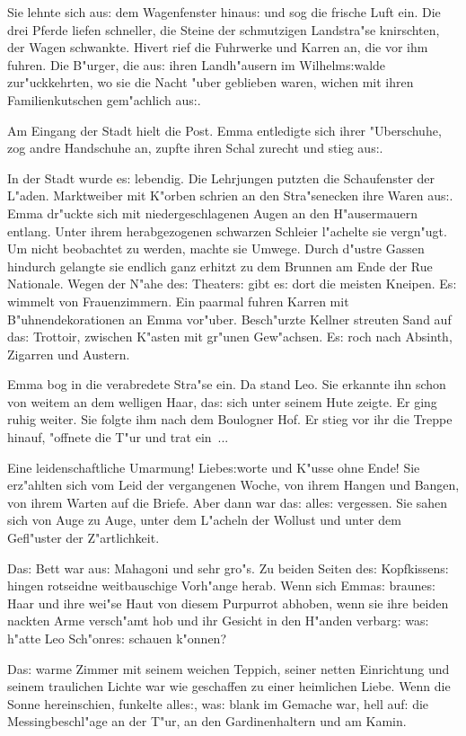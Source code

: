 \documentclass[oneside,12pt]{book}
\newcommand{\s}{s:}%
\begin{document}
Sie lehnte sich au{\s} dem Wagenfenster hinau{\s} und sog die
frische Luft ein. Die drei Pferde liefen schneller, die Steine der
schmutzigen Landstra"se knirschten, der Wagen schwankte. Hivert
rief die Fuhrwerke und Karren an, die vor ihm fuhren. Die B"urger,
die au{\s} ihren Landh"ausern im Wilhelm{\s}walde zur"uckkehrten,
wo sie die Nacht "uber geblieben waren, wichen mit ihren
Familienkutschen gem"achlich au{\s}.

Am Eingang der Stadt hielt die Post. Emma entledigte sich ihrer
"Uberschuhe, zog andre Handschuhe an, zupfte ihren Schal zurecht
und stieg au{\s}.

In der Stadt wurde e{\s} lebendig. Die Lehrjungen putzten die
Schaufenster der L"aden. Marktweiber mit K"orben schrien an den
Stra"senecken ihre Waren au{\s}. Emma dr"uckte sich mit
niedergeschlagenen Augen an den H"ausermauern entlang. Unter ihrem
herabgezogenen schwarzen Schleier l"achelte sie vergn"ugt. Um
nicht beobachtet zu werden, machte sie Umwege. Durch d"ustre
Gassen hindurch gelangte sie endlich ganz erhitzt zu dem Brunnen
am Ende der Rue Nationale. Wegen der N"ahe de{\s} Theater{\s} gibt
e{\s} dort die meisten Kneipen. E{\s} wimmelt von Frauenzimmern.
Ein paarmal fuhren Karren mit B"uhnendekorationen an Emma
vor"uber. Besch"urzte Kellner streuten Sand auf da{\s} Trottoir,
zwischen K"asten mit gr"unen Gew"achsen. E{\s} roch nach Absinth,
Zigarren und Austern.

Emma bog in die verabredete Stra"se ein. Da stand Leo. Sie
erkannte ihn schon von weitem an dem welligen Haar, da{\s} sich
unter seinem Hute zeigte. Er ging ruhig weiter. Sie folgte ihm
nach dem Boulogner Hof. Er stieg vor ihr die Treppe hinauf,
"offnete die T"ur und trat ein~...

Eine leidenschaftliche Umarmung! Liebe{\s}worte und K"usse ohne
Ende! Sie erz"ahlten sich vom Leid der vergangenen Woche, von
ihrem Hangen und Bangen, von ihrem Warten auf die Briefe. Aber
dann war da{\s} alle{\s} vergessen. Sie sahen sich von Auge zu
Auge, unter dem L"acheln der Wollust und unter dem Gefl"uster der
Z"artlichkeit.

Da{\s} Bett war au{\s} Mahagoni und sehr gro"s. Zu beiden Seiten
de{\s} Kopfkissen{\s} hingen rotseidne weitbauschige Vorh"ange
herab. Wenn sich Emma{\s} braune{\s} Haar und ihre wei"se Haut von
diesem Purpurrot abhoben, wenn sie ihre beiden nackten Arme
versch"amt hob und ihr Gesicht in den H"anden verbarg: wa{\s}
h"atte Leo Sch"onre{\s} schauen k"onnen?

Da{\s} warme Zimmer mit seinem weichen Teppich, seiner netten
Einrichtung und seinem traulichen Lichte war wie geschaffen zu
einer heimlichen Liebe. Wenn die Sonne hereinschien, funkelte
alle{\s}, wa{\s} blank im Gemache war, hell auf: die
Messingbeschl"age an der T"ur, an den Gardinenhaltern und am
Kamin.
\end{document}
